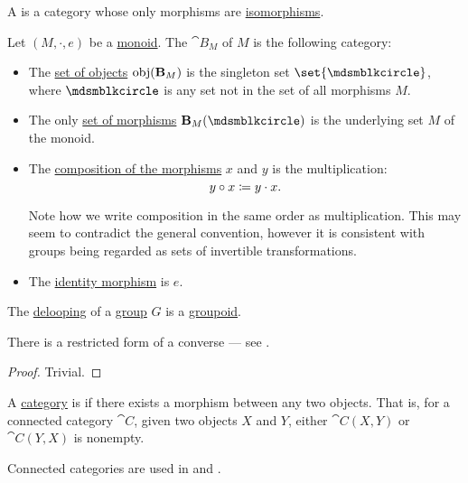 \begin{definition}\label{def:groupoid}
  A  is a category whose only morphisms are \hyperref[def:morphism_invertibility/isomorphism]{isomorphisms}.
\end{definition}

\begin{definition}\label{def:monoid_delooping}
  Let \( (M, \cdot, e) \) be a \hyperref[def:monoid]{monoid}. The  \( \cat{B}_M \) of \( M \) is the following category:
  \begin{itemize}
    \item The \hyperref[def:category/objects]{set of objects} \( \operatorname{obj}(\operatorname{\mathbf{B}}_M) \) is the singleton set \( \set{ \Anon } \), where \( \Anon \) is any set not in the set of all morphisms \( M \).

    \item The only \hyperref[def:category/morphisms]{set of morphisms} \( \cat{B}_M(\Anon) \) is the underlying set \( M \) of the monoid.

    \item The \hyperref[def:category/composition]{composition of the morphisms} \( x \) and \( y \) is the multiplication:
    \begin{equation*}
      y \bincirc x \coloneqq y \cdot x.
    \end{equation*}

    Note how we write composition in the same order as multiplication. This may seem to contradict the general convention, however it is consistent with groups being regarded as sets of invertible transformations.

    \item The \hyperref[def:category/identity]{identity morphism} is \( e \).
  \end{itemize}
\end{definition}

\begin{proposition}\label{thm:delooping_of_group}
  The \hyperref[def:monoid_delooping]{delooping} of a \hyperref[def:group]{group} \( G \) is a \hyperref[def:groupoid]{groupoid}.

  There is a restricted form of a converse --- see .
\end{proposition}
\begin{proof}
  Trivial.
\end{proof}

\begin{definition}\label{def:connected_category}
  A \hyperref[def:category]{category} is  if there exists a morphism between any two objects. That is, for a connected category \( \cat{C} \), given two objects \( X \) and \( Y \), either \( \cat{C}(X, Y) \) or \( \cat{C}(Y, X) \) is nonempty.

  Connected categories are used in  and .
\end{definition}

